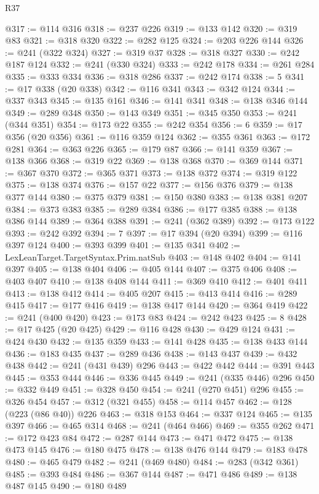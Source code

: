 \begin{lexlean}{R37}
\begin{coremodule}
@317 := @114 @316
@318 := @237 @226
@319 := @133 @142
@320 := @319 @83
@321 := @318 @320
@322 := @282 @125
@324 := @203 @226 @144
@326 := @241 (@322 @324)
@327 := @319 @37
@328 := @318 @327
@330 := @242 @187 @124
@332 := @241 (@330 @324)
@333 := @242 @178
@334 := @261 @284
@335 := @333 @334
@336 := @318 @286
@337 := @242 @174
@338 := 5
@341 := @17 @338 (@20 @338)
@342 := @116 @341
@343 := @342 @124
@344 := @337 @343
@345 := @135 @161
@346 := @141 @341
@348 := @138 @346 @144
@349 := @289 @348
@350 := @143 @349
@351 := @345 @350
@353 := @241 (@344 @351)
@354 := @173 @22
@355 := @242 @354
@356 := 6
@359 := @17 @356 (@20 @356)
@361 := @116 @359 @124
@362 := @355 @361
@363 := @172 @281
@364 := @363 @226
@365 := @179 @87
@366 := @141 @359
@367 := @138 @366
@368 := @319 @22
@369 := @138 @368
@370 := @369 @144
@371 := @367 @370
@372 := @365 @371
@373 := @138 @372
@374 := @319 @122
@375 := @138 @374
@376 := @157 @22
@377 := @156 @376
@379 := @138 @377 @144
@380 := @375 @379
@381 := @150 @380
@383 := @138 @381 @207
@384 := @373 @383
@385 := @289 @384
@386 := @177 @385
@388 := @138 @386 @144
@389 := @364 @388
@391 := @241 (@362 @389)
@392 := @173 @122
@393 := @242 @392
@394 := 7
@397 := @17 @394 (@20 @394)
@399 := @116 @397 @124
@400 := @393 @399
@401 := @135 @341
@402 := LexLeanTarget.TargetSyntax.Prim.natSub
@403 := @148 @402
@404 := @141 @397
@405 := @138 @404
@406 := @405 @144
@407 := @375 @406
@408 := @403 @407
@410 := @138 @408 @144
@411 := @369 @410
@412 := @401 @411
@413 := @138 @412
@414 := @405 @207
@415 := @413 @414
@416 := @289 @415
@417 := @177 @416
@419 := @138 @417 @144
@420 := @364 @419
@422 := @241 (@400 @420)
@423 := @173 @83
@424 := @242 @423
@425 := 8
@428 := @17 @425 (@20 @425)
@429 := @116 @428
@430 := @429 @124
@431 := @424 @430
@432 := @135 @359
@433 := @141 @428
@435 := @138 @433 @144
@436 := @183 @435
@437 := @289 @436
@438 := @143 @437
@439 := @432 @438
@442 := @241 (@431 @439) @296
@443 := @422 @442
@444 := @391 @443
@445 := @353 @444
@446 := @336 @445
@449 := @241 (@335 @446) @296
@450 := @332 @449
@451 := @328 @450
@454 := @241 (@270 @451) @296
@455 := @326 @454
@457 := @312 (@321 @455)
@458 := @114 @457
@462 := @128 (@223 (@86 @40)) @226
@463 := @318 @153
@464 := @337 @124
@465 := @135 @397
@466 := @465 @314
@468 := @241 (@464 @466)
@469 := @355 @262
@471 := @172 @423 @84
@472 := @287 @144
@473 := @471 @472
@475 := @138 @473 @145
@476 := @180 @475
@478 := @138 @476 @144
@479 := @183 @478
@480 := @465 @479
@482 := @241 (@469 @480)
@484 := @283 (@342 @361)
@485 := @393 @484
@486 := @367 @144
@487 := @471 @486
@489 := @138 @487 @145
@490 := @180 @489

\end{coremodule}
\end{lexlean}
